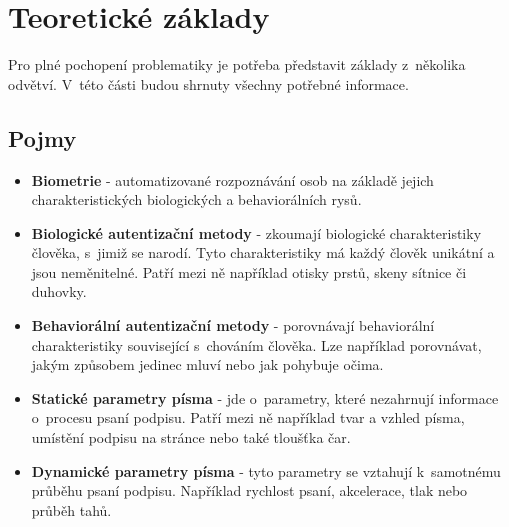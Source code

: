 
\chapter{Teoretické základy}
Pro plné pochopení problematiky je potřeba představit základy z~několika odvětví. 
V~této části budou shrnuty všechny potřebné informace. 

\section{Pojmy}
\label{sec:pojmy}
\begin{itemize}
  \item{\textbf{Biometrie} - automatizované rozpoznávání osob na základě jejich charakteristických biologických a behaviorálních rysů.} %
  \item{\textbf{Biologické autentizační metody} - zkoumají biologické charakteristiky člověka, s~jimiž se narodí. Tyto charakteristiky má každý člověk unikátní a jsou neměnitelné. Patří mezi ně například otisky prstů, skeny sítnice či duhovky.}  
  \item{\textbf{Behaviorální autentizační metody} - porovnávají behaviorální charakteristiky související s~chováním člověka. Lze například porovnávat, jakým způsobem jedinec mluví nebo jak pohybuje očima.}
  \item{\textbf{Statické parametry písma} - jde o~parametry, které nezahrnují informace o~procesu psaní podpisu. Patří mezi ně například tvar a vzhled písma, umístění podpisu na stránce nebo také tloušťka čar.}
  \item{\textbf{Dynamické parametry písma} - tyto parametry se vztahují k~samotnému průběhu psaní podpisu. Například rychlost psaní, akcelerace, tlak nebo průběh tahů.}
\end{itemize}

